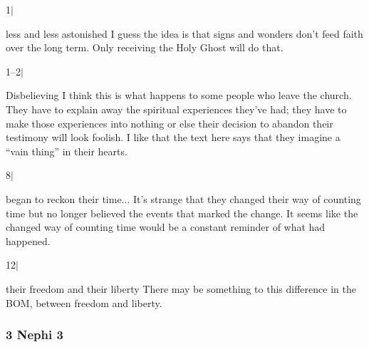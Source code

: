 		\begin{compactdesc}
		
		\item[1$\vert$]
		\begin{compactdesc}
		\item[less and less astonished] I guess the idea is that signs and wonders don't feed faith over the long term. Only receiving the Holy Ghost will do that.
		\end{compactdesc}
		
		\item[1--2$\vert$]
		\begin{compactdesc}
		\item[Disbelieving] I think this is what happens to some people who leave the church. They have to explain away the spiritual experiences they've had; they have to make those experiences into nothing or else their decision to abandon their testimony will look foolish. I like that the text here says that they imagine a ``vain thing'' in their hearts.
		\end{compactdesc}
		
		\item[8$\vert$]
		\begin{compactdesc}
		\item[began to reckon their time...] It's strange that they changed their way of counting time but no longer believed the events that marked the change. It seems like the changed way of counting time would be a constant reminder of what had happened.
		\end{compactdesc}
		
		\item[12$\vert$]
		\begin{compactdesc}
		\item[their freedom and their liberty] There may be something to this difference in the BOM, between freedom and liberty.
		\end{compactdesc}
		
		\end{compactdesc}
		
	\subsubsection{3 Nephi 3} %
	
